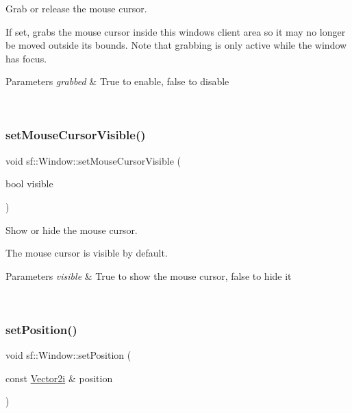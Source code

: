 Grab or release the mouse cursor. 

If set, grabs the mouse cursor inside this window\textquotesingle{}s client area so it may no longer be moved outside its bounds. Note that grabbing is only active while the window has focus.


\begin{DoxyParams}{Parameters}
{\em grabbed} & True to enable, false to disable \begin{DoxyVerb}\end{DoxyVerb}
 \\
\hline
\end{DoxyParams}
\mbox{\label{classsf_1_1_window_aad3991c25e0a83afbb4d62febf9b7b14}} 
\subsubsection{\texorpdfstring{setMouseCursorVisible()}{setMouseCursorVisible()}}
{\footnotesize\ttfamily void sf\+::\+Window\+::set\+Mouse\+Cursor\+Visible (\begin{DoxyParamCaption}\item[{bool}]{visible }\end{DoxyParamCaption})}



Show or hide the mouse cursor. 

The mouse cursor is visible by default.


\begin{DoxyParams}{Parameters}
{\em visible} & True to show the mouse cursor, false to hide it \begin{DoxyVerb}\end{DoxyVerb}
 \\
\hline
\end{DoxyParams}
\mbox{\label{classsf_1_1_window_a6c4078bfbf61c29bfc4b4732ce764f17}} 
\subsubsection{\texorpdfstring{setPosition()}{setPosition()}}
{\footnotesize\ttfamily void sf\+::\+Window\+::set\+Position (\begin{DoxyParamCaption}\item[{const \mbox{\hyperlink{classsf_1_1_vector2}{Vector2i}} \&}]{position }\end{DoxyParamCaption})}



